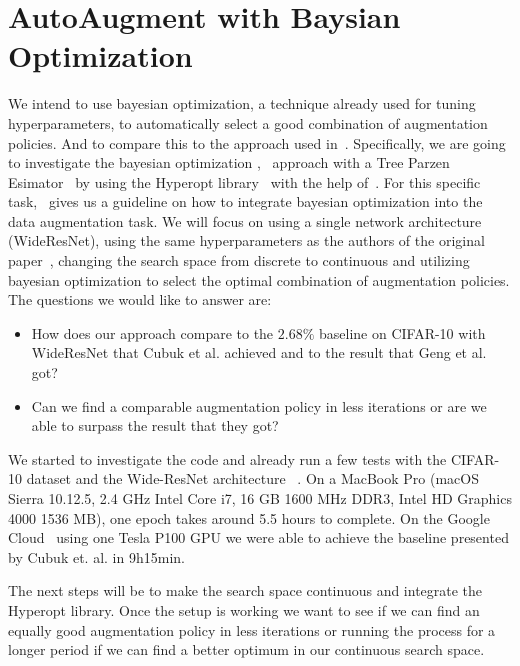 \documentclass[10pt,twocolumn,letterpaper]{article}
\begin{document}
\section{AutoAugment with Baysian Optimization}

We intend to use bayesian optimization, a technique already used for tuning hyperparameters, to automatically select a good combination of augmentation policies. And to compare this to the approach used in~\cite{Ekin}.
Specifically, we are going to investigate the bayesian optimization \cite{2018arXiv180702811F},~\cite{Goodfellow-et-al-2016} approach with a Tree Parzen Esimator~\cite{Kaggle_AMT} by using the Hyperopt library~\cite{HyperOpt} with the help of~\cite{BO_Hyperopt}. For this specific task,~\cite{2017arXiv171010564T} gives us a guideline on how to integrate bayesian optimization into the data augmentation task.
We will focus on using a single network architecture (WideResNet), using the same hyperparameters as the authors of the original paper~\cite{Ekin}, changing the search space from discrete to continuous and utilizing bayesian optimization to select the optimal combination of augmentation policies. The questions we would like to answer are: 
\begin{itemize}
\item How does our approach compare to the $2.68\%$ baseline on CIFAR-10 with WideResNet that Cubuk et al. achieved and to the result that Geng et al. got? 
\item Can we find a comparable augmentation policy in less iterations or are we able to surpass the result that they got?
\end{itemize}

We started to investigate the code and already run a few tests with the CIFAR-10 dataset and the Wide-ResNet architecture ~\cite{Ekin}. On a MacBook Pro (macOS Sierra 10.12.5, 2.4 GHz Intel Core i7, 16 GB 1600 MHz DDR3, Intel HD Graphics 4000 1536 MB), one epoch takes around 5.5 hours to complete. On the Google Cloud~\cite{GCloud} using one Tesla P100 GPU we were able to achieve the baseline presented by Cubuk et. al. in 9h15min.

The next steps will be to make the search space continuous and integrate the Hyperopt library. Once the setup is working we want to see if we can find an equally good augmentation policy in less iterations or running the process for a longer period if we can find a better optimum in our continuous search space.





{\small


}
\end{document}
